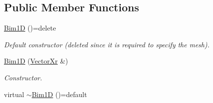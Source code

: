 \subsection*{Public Member Functions}
\begin{DoxyCompactItemize}
\item 
\hypertarget{classBim1D_aaa2cb4f70036268c64965b09be0ee721}{\hyperlink{classBim1D_aaa2cb4f70036268c64965b09be0ee721}{Bim1\-D} ()=delete}\label{classBim1D_aaa2cb4f70036268c64965b09be0ee721}

\begin{DoxyCompactList}\small\item\em Default constructor (deleted since it is required to specify the mesh). \end{DoxyCompactList}\item 
\hyperlink{classBim1D_a54ee6a3d7e3ebf52392f80800e31241c}{Bim1\-D} (\hyperlink{typedefs_8h_aae6cee78ed9cd8f234ed8cb48682548a}{Vector\-Xr} \&)
\begin{DoxyCompactList}\small\item\em Constructor. \end{DoxyCompactList}\item 
\hypertarget{classBim1D_a2fa6995307b37f25bf3c047a959e8b5a}{virtual \hyperlink{classBim1D_a2fa6995307b37f25bf3c047a959e8b5a}{$\sim$\-Bim1\-D} ()=default}\label{classBim1D_a2fa6995307b37f25bf3c047a959e8b5a}


\end{DoxyCompactItemize}
